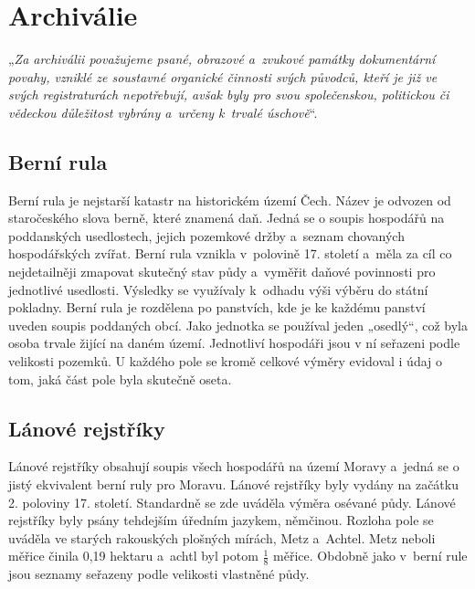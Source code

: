 \chapter{Archiválie}
„\textit{Za archiválii \cite{ArchivnictvíSkripta} považujeme psané, obrazové a~zvukové památky dokumentární povahy, vzniklé ze soustavné organické činnosti svých původců, kteří je již ve svých registraturách nepotřebují, avšak byly pro svou společenskou, politickou či vědeckou důležitost vybrány a~určeny k~trvalé úschově}“.

\section{Berní rula}
Berní rula \cite{SestavteSiRodokmen, berniRula} je nejstarší katastr na historickém území Čech. Název je odvozen od staročeského slova berně, které znamená daň. Jedná se o soupis hospodářů na poddanských usedlostech, jejich pozemkové držby a~seznam chovaných hospodářských zvířat. Berní rula vznikla v~polovině 17. století a~měla za cíl co nejdetailněji zmapovat skutečný stav půdy a~vyměřit daňové povinnosti pro jednotlivé usedlosti. Výsledky se využívaly k~odhadu výši výběru do státní pokladny. Berní rula je rozdělena po panstvích, kde je ke každému panství uveden soupis poddaných obcí. Jako jednotka se používal jeden „osedlý“, což byla osoba trvale žijící na daném území. Jednotliví hospodáři jsou v ní seřazeni podle velikosti pozemků. 
U každého pole se kromě celkové výměry evidoval i údaj o tom, jaká část pole byla skutečně oseta.

\section{Lánové rejstříky}
Lánové rejstříky \cite{SestavteSiRodokmen, lanoveRejstriky} obsahují soupis všech hospodářů na území Moravy a~jedná se o jistý ekvivalent berní ruly pro Moravu. Lánové rejstříky byly vydány na začátku 2. poloviny 17. století. Standardně se zde uváděla výměra osévané půdy. Lánové rejstříky byly psány tehdejším úředním jazykem, němčinou. Rozloha pole se uváděla ve starých rakouských plošných mírách, Metz a~Achtel. Metz neboli měřice činila 0,19 hektaru a~achtl byl potom $\frac{1}{8}$ měřice. Obdobně jako v~berní rule jsou seznamy seřazeny podle velikosti vlastněné půdy.

